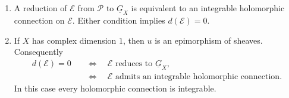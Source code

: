 \begin{lemma}
\begin{enumerate}
Lemma \ref{lemma-crossed-homomorphism-torsor-obstruction} gives a class
$$
d(\mathcal E)=d_u(\mathcal E)
\in
H^1\bigl(X,
\Omega_X^1(\operatorname{ad}(\mathcal E))\bigr),
$$
and this class is zero if and only if $\mathcal E$ admits a holomorphic
connection.
\item A reduction of $\mathcal E$ from $\mathcal P$ to
$\underline G_X$ is equivalent to an integrable holomorphic connection on
$\mathcal E$. Either condition implies $d(\mathcal E)=0$.
\item If $X$ has complex dimension $1$, then $u$ is an epimorphism of
sheaves. Consequently
\begin{align*}
d(\mathcal E)=0
&\quad\Longleftrightarrow\quad
\mathcal E\text{ reduces to }\underline G_X, \\
&\quad\Longleftrightarrow\quad
\mathcal E\text{ admits an integrable holomorphic connection}.
\end{align*}
In this case every holomorphic connection is integrable.
\end{enumerate}
\end{lemma}

